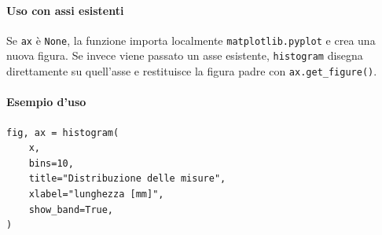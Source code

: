 \paragraph{Uso con assi esistenti}
Se \texttt{ax} è \texttt{None}, la funzione importa localmente \texttt{matplotlib.pyplot} e crea una nuova figura. Se invece viene passato un asse esistente, \texttt{histogram} disegna direttamente su quell'asse e restituisce la figura padre con \texttt{ax.get\_figure()}.

\paragraph{Esempio d'uso}
\begin{verbatim}
fig, ax = histogram(
    x,
    bins=10,
    title="Distribuzione delle misure",
    xlabel="lunghezza [mm]",
    show_band=True,
)
\end{verbatim}
